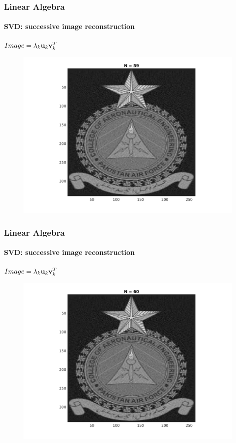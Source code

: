 \documentclass[hyperref={pdfpagelabels=true}]{beamer}
\begin{document}
\begin{frame}
\frametitle{Linear Algebra}
\framesubtitle{SVD: successive image reconstruction} 
\small{
\begin{center}
$Image = \lambda_k{\bf u}_k {\bf v}_k^T$
\end{center}}
\begin{figure}[!htb]
\centering
\includegraphics [scale=0.48]{n/b59.png}
\end{figure}
\end{frame}

\begin{frame}
\frametitle{Linear Algebra}
\framesubtitle{SVD: successive image reconstruction} 
\small{
\begin{center}
$Image = \lambda_k{\bf u}_k {\bf v}_k^T$
\end{center}}
\begin{figure}[!htb]
\centering
\includegraphics [scale=0.48]{n/b60.png}
\end{figure}
\end{frame}
\end{document}
